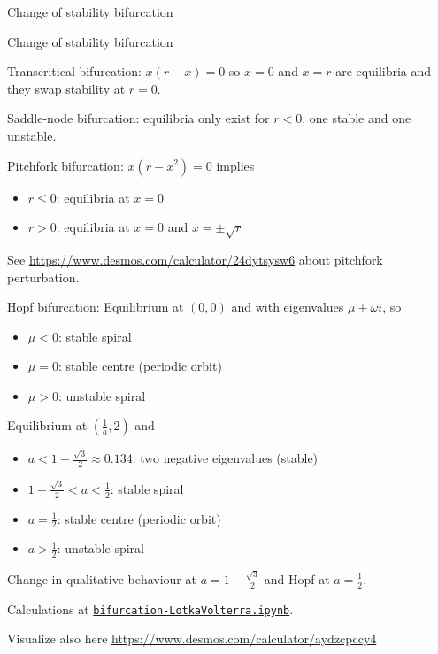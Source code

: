 \documentclass{workbook}
\begin{document}
\begin{solution}
\begin{slide}
\begin{parts}
	\item Change of stability bifurcation
	\item Change of stability bifurcation
	\item Transcritical bifurcation: $x(r-x) = 0$ so $x=0$ and $x=r$ are equilibria and they swap stability at $r=0$.
	\item Saddle-node bifurcation: equilibria only exist for $r<0$, one stable and one unstable.
	\item Pitchfork bifurcation: $x(r-x^2)=0$ implies
	\begin{itemize}
		\item $r\leq 0$: equilibria at $x=0$
		\item $r>0$: equilibria at $x=0$ and $x=\pm \sqrt{r}$
	\end{itemize}
	See \url{https://www.desmos.com/calculator/24dytsysw6} about pitchfork perturbation.
	\item Hopf bifurcation: Equilibrium at $(0,0)$ and with eigenvalues $\mu \pm \omega i$, so
	\begin{itemize}
		\item $\mu<0$: stable spiral
		\item $\mu = 0$: stable centre (periodic orbit)
		\item $\mu > 0$: unstable spiral
	\end{itemize}
	\item Equilibrium at $(\frac{1}{a},2)$ and
	\begin{itemize}
		\item $a < 1-\frac{\sqrt{3}}{2} \approx 0.134$: two negative eigenvalues (stable)
		\item $1-\frac{\sqrt{3}}{2}< a < \frac12$: stable spiral
		\item $ a = \frac12$: stable centre (periodic orbit)
		\item $ a > \frac12$: unstable spiral
	\end{itemize}
	
	Change in qualitative behaviour at $a = 1-\frac{\sqrt{3}}{2}$ and Hopf at $a = \frac12$.
	
	Calculations at \href{https://utoronto.syzygy.ca/jupyter/user-redirect/git-pull?repo=https://github.com/bigfatbernie/IBLMathModeling&subPath=python/bifurcation-LotkaVolterra.ipynb}{\tt bifurcation-LotkaVolterra.ipynb}.
	
	Visualize also here \url{https://www.desmos.com/calculator/aydzcpccy4}

\end{parts}
	
\end{slide}
	
\end{solution}
\end{document}
